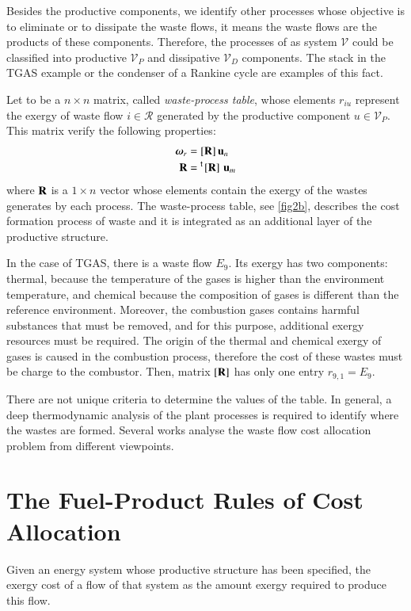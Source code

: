\documentclass{ecos2018}
\begin{document}
Besides the productive components, we identify other processes whose objective is to eliminate or to dissipate the waste flows, it means the waste flows are the products of these components. Therefore, the processes of as system $\mathcal{V}$ could be classified into productive $\mathcal{V}_P$ and dissipative $\mathcal{V}_D$ components.  
The stack in the TGAS example or the condenser of a Rankine cycle are examples of this fact.

Let  to be a $n \times n$ matrix, called \emph{waste-process table}, whose elements $r_{iu}$ represent the exergy of waste flow $i\in\mathcal{R}$ generated by the productive component $u\in\mathcal{V}_P$. This matrix verify the following properties:
\begin{align}
\bm{\omega}_r &=[\mathbf{R}]\,\mathbf{u}_n \\
\mathbf{R} &=\prescript{\smash{\mathsf{t}}}{}{\mskip-1mu}\left[ \textbf{R} \right]\,\mathbf{u}_m
\end{align}
where $\mathbf{R}$ is a $1\times n$ vector whose elements contain the exergy of the wastes generates by each process. The waste-process table, see \cref{fig2b}, describes the cost formation process of waste and it is integrated as an additional layer of the productive structure.

In the case of TGAS, there is a waste flow $E_9$. Its exergy has two components: thermal, because the  temperature of the gases is higher than the environment temperature, and chemical because the composition of gases is different than the reference environment. Moreover, the combustion gases contains harmful substances that must be removed, and for this purpose, additional exergy resources must be required. The origin of the thermal and chemical exergy of gases is caused in the combustion process, therefore the cost of these wastes must be charge to the combustor. Then, matrix $\left[ \textbf{R} \right]$ has only one entry $r_{9,1}=E_9$.

There are not unique criteria to determine the values of the  table. In general, a deep thermodynamic analysis of the plant processes is required to identify where the wastes are formed. Several works \cite{Frangopoulos87,Gonzalez03,Mendes17} analyse the waste flow cost allocation problem from different viewpoints.

\section{The Fuel-Product Rules of Cost Allocation}
Given an energy system whose productive structure has been specified, the exergy cost of a flow of that system as the amount exergy required to produce this flow.
\end{document}

